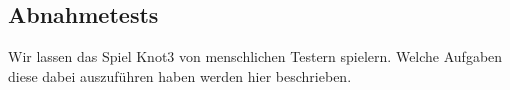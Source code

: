 %



\newpage



\subsection*{Abnahmetests}
\label{Abschnitt:Tests:Protokoll:Abnahme}

Wir lassen das Spiel Knot3 von menschlichen Testern spielern. Welche Aufgaben diese dabei auszuführen haben werden hier beschrieben.





